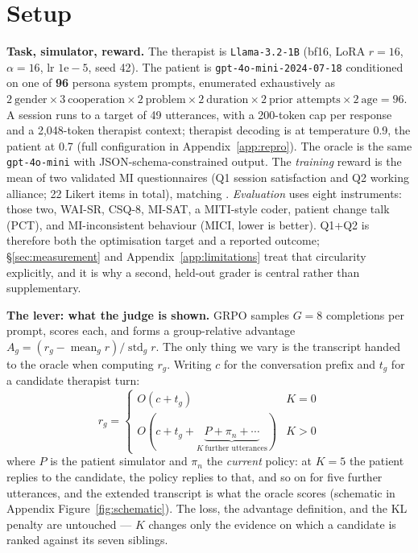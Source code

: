 \section{Setup}
\label{sec:setup}

\textbf{Task, simulator, reward.} The therapist is \texttt{Llama-3.2-1B} (bf16, LoRA $r{=}16$,
$\alpha{=}16$, lr $1\mathrm{e}{-}5$, seed 42). The patient is \texttt{gpt-4o-mini-2024-07-18}
conditioned on one of \textbf{96} persona system prompts, enumerated exhaustively as
$2\ \text{gender} \times 3\ \text{cooperation} \times 2\ \text{problem} \times 2\ \text{duration}
\times 2\ \text{prior attempts} \times 2\ \text{age} = 96$. A session runs to a target of 49
utterances, with a 200-token cap per response and a 2{,}048-token therapist context; therapist
decoding is at temperature 0.9, the patient at 0.7 (full configuration in
Appendix~\ref{app:repro}). The oracle is the same \texttt{gpt-4o-mini} with
JSON-schema-constrained output. The \emph{training} reward is the mean of two validated MI
questionnaires (Q1 session satisfaction and Q2 working alliance; 22 Likert items in total),
matching \citet{baruch2025pto}. \emph{Evaluation} uses eight instruments: those two, WAI-SR,
CSQ-8, MI-SAT, a MITI-style coder, patient change talk (PCT), and MI-inconsistent behaviour (MICI,
lower is better). Q1+Q2 is therefore both the optimisation target and a reported outcome;
\S\ref{sec:measurement} and Appendix~\ref{app:limitations} treat that circularity explicitly, and
it is why a second, held-out grader is central rather than supplementary.

\textbf{The lever: what the judge is shown.}
\label{sec:setup-lever}
GRPO samples $G{=}8$ completions per prompt, scores each, and forms a group-relative advantage
$A_g = (r_g - \operatorname{mean}_g r)/\operatorname{std}_g r$. The only thing we vary is the
transcript handed to the oracle when computing $r_g$. Writing $c$ for the conversation prefix and
$t_g$ for a candidate therapist turn:
\[
r_g =
\begin{cases}
O(c + t_g) & K = 0\\[2pt]
O\!\left(c + t_g + \underbrace{P + \pi_n + \cdots}_{K\ \text{further utterances}}\right) & K > 0
\end{cases}
\]
where $P$ is the patient simulator and $\pi_n$ the \emph{current} policy: at $K{=}5$ the patient
replies to the candidate, the policy replies to that, and so on for five further utterances, and
the extended transcript is what the oracle scores (schematic in Appendix
Figure~\ref{fig:schematic}). The loss, the advantage definition, and the KL penalty are untouched
--- $K$ changes only the evidence on which a candidate is ranked against its seven siblings.

